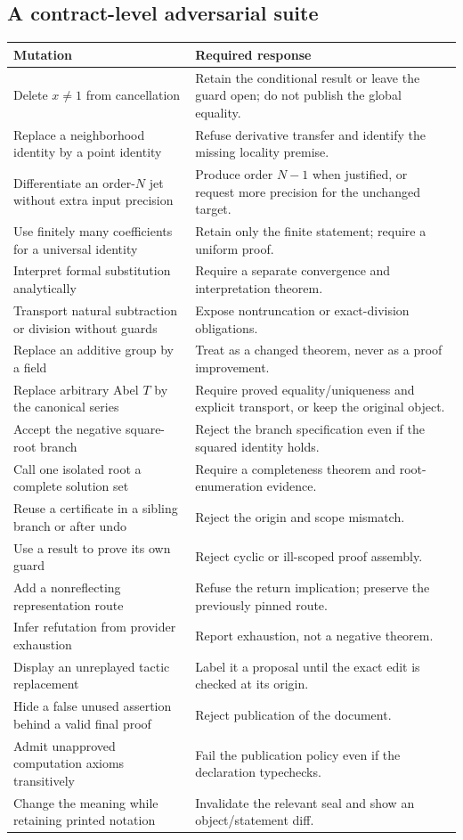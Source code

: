 \documentclass[11pt,a4paper]{article}
\theoremstyle{remark}\newtheorem{example}[proposition]{Example}
\begin{document}
\subsection{A contract-level adversarial suite}
\begin{longtable}{@{}P{.36\textwidth}P{.56\textwidth}@{}}
\toprule
Mutation & Required response \\
\midrule\endhead
Delete $x\ne1$ from cancellation & Retain the conditional result or leave the guard open; do not publish the global equality.\\
Replace a neighborhood identity by a point identity & Refuse derivative transfer and identify the missing locality premise.\\
Differentiate an order-$N$ jet without extra input precision & Produce order $N-1$ when justified, or request more precision for the unchanged target.\\
Use finitely many coefficients for a universal identity & Retain only the finite statement; require a uniform proof.\\
Interpret formal substitution analytically & Require a separate convergence and interpretation theorem.\\
Transport natural subtraction or division without guards & Expose nontruncation or exact-division obligations.\\
Replace an additive group by a field & Treat as a changed theorem, never as a proof improvement.\\
Replace arbitrary Abel $T$ by the canonical series & Require proved equality/uniqueness and explicit transport, or keep the original object.\\
Accept the negative square-root branch & Reject the branch specification even if the squared identity holds.\\
Call one isolated root a complete solution set & Require a completeness theorem and root-enumeration evidence.\\
Reuse a certificate in a sibling branch or after undo & Reject the origin and scope mismatch.\\
Use a result to prove its own guard & Reject cyclic or ill-scoped proof assembly.\\
Add a nonreflecting representation route & Refuse the return implication; preserve the previously pinned route.\\
Infer refutation from provider exhaustion & Report exhaustion, not a negative theorem.\\
Display an unreplayed tactic replacement & Label it a proposal until the exact edit is checked at its origin.\\
Hide a false unused assertion behind a valid final proof & Reject publication of the document.\\
Admit unapproved computation axioms transitively & Fail the publication policy even if the declaration typechecks.\\
Change the meaning while retaining printed notation & Invalidate the relevant seal and show an object/statement diff.\\
\bottomrule
\end{longtable}
\end{document}
